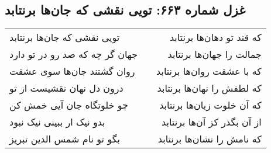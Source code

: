 \begin{center}
\section*{غزل شماره ۶۶۳: تویی نقشی که جان‌ها برنتابد}
\label{sec:0663}
\begin{longtable}{l p{0.5cm} r}
تویی نقشی که جان‌ها برنتابد
&&
که قند تو دهان‌ها برنتابد
\\
جهان گر چه که صد رو در تو دارد
&&
جمالت را جهان‌ها برنتابد
\\
روان گشتند جان‌ها سوی عشقت
&&
که با عشقت روان‌ها برنتابد
\\
درون دل نهان نقشیست از تو
&&
که لطفش را نهان‌ها برنتابد
\\
چو خلوتگاه جان آیی خمش کن
&&
که آن خلوت زبان‌ها برنتابد
\\
بدو نیک ار ببینی نیک نبود
&&
از آن بگذر کز آن‌ها برنتابد
\\
بگو تو نام شمس الدین تبریز
&&
که نامش را نشان‌ها برنتابد
\\
\end{longtable}
\end{center}
